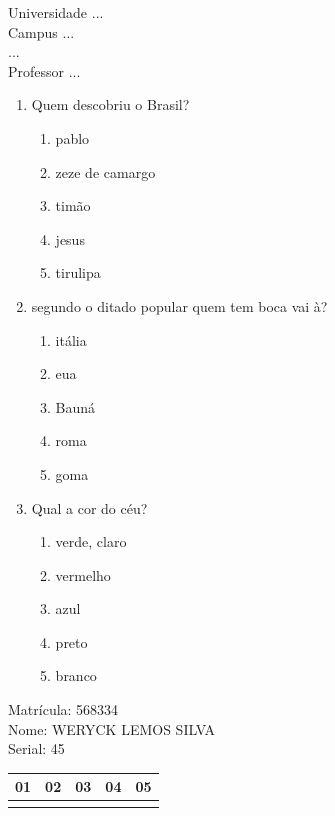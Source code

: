 \documentclass[10pt,a4paper,twocolumn]{report}
\begin{document}
\begin{flushleft}
Universidade ...\\
Campus ...\\
...\\
Professor ...\\
\end{flushleft}




 \begin{enumerate} 
    \item  Quem descobriu o Brasil?





    \begin{enumerate}
    \item  pablo

\item  zeze de camargo

\item  timão

\item  jesus

\item  tirulipa


    \end{enumerate} 
    \item  segundo o ditado popular quem tem boca vai à?





    \begin{enumerate}
    \item  itália

\item  eua

\item  Bauná

\item  roma

\item  goma


    \end{enumerate} 
    \item  Qual a cor do céu?





    \begin{enumerate}
    \item  verde, claro

\item  vermelho

\item  azul

\item  preto

\item  branco


    \end{enumerate}\end{enumerate} 
Matrícula: 568334\\ Nome: WERYCK LEMOS SILVA \\ Serial: 45\\
\begin{tabular}{|l|l|l|l|l|}\hline
01  &02  &03  &04  &05 \\ \hline 
 & & & & \\ \hline 
\end{tabular}
 \cleardoublepage 
\end{document}
